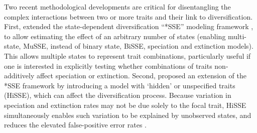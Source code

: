 Two recent methodological developments are critical for disentangling the complex interactions between two or more traits and their link to diversification.
First, \citet{fitzjohn_2012} extended the state-dependent diversification ``*SSE'' modeling framework \citep{maddison_2007}, to allow estimating the effect of an arbitrary number of states (enabling multi-state, MuSSE, instead of binary state, BiSSE, speciation and extinction models).
This allows multiple states to represent trait combinations, particularly useful if one is interested in explicitly testing whether combinations of traits non-additively affect speciation or extinction. 
Second, \citet{beaulieu_2016}  proposed an extension of the *SSE framework by introducing a model with `hidden' or unspecified traits (HiSSE), which can affect the diversification process.
Because variation in speciation and extinction rates may not be due solely to the focal trait, HiSSE simultaneously enables such variation to be explained by unobserved states, and reduces the elevated false-positive error rates \citep{rabosky_2015}.
